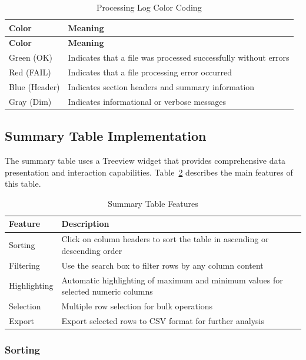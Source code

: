 \documentclass[11pt,a4paper]{article}
\begin{document}
\begin{longtable}{p{3cm}p{11cm}}
\caption{Processing Log Color Coding}\label{tab:log_colors}\\
\toprule
\textbf{Color} & \textbf{Meaning} \\
\midrule
\endfirsthead
\toprule
\textbf{Color} & \textbf{Meaning} \\
\midrule
\endhead
Green (OK) & Indicates that a file was processed successfully without errors \\
Red (FAIL) & Indicates that a file processing error occurred \\
Blue (Header) & Indicates section headers and summary information \\
Gray (Dim) & Indicates informational or verbose messages \\
\bottomrule
\end{longtable}

\subsection{Summary Table Implementation}

The summary table uses a Treeview widget that provides comprehensive data presentation and interaction capabilities. Table~\ref{tab:table_features} describes the main features of this table.

\begin{table}[h]
\centering
\caption{Summary Table Features}\label{tab:table_features}
\begin{tabular}{p{4cm}p{10cm}}
\toprule
\textbf{Feature} & \textbf{Description} \\
\midrule
Sorting & Click on column headers to sort the table in ascending or descending order \\
Filtering & Use the search box to filter rows by any column content \\
Highlighting & Automatic highlighting of maximum and minimum values for selected numeric columns \\
Selection & Multiple row selection for bulk operations \\
Export & Export selected rows to CSV format for further analysis \\
\bottomrule
\end{tabular}
\end{table}

\subsubsection{Sorting}
\end{document}
